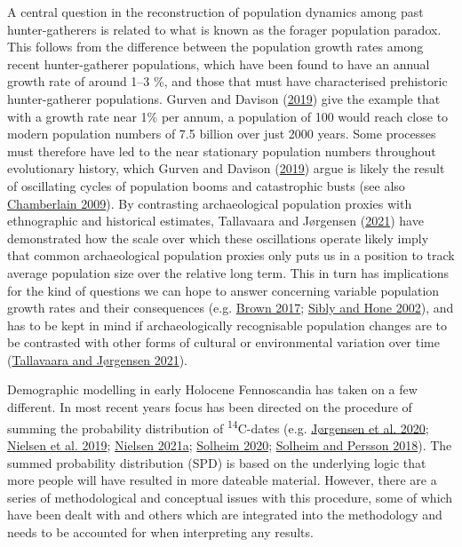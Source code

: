 \documentclass[
  12pt,
  a4paper,
  oneside]{book}
\begin{document}
A central question in the reconstruction of population dynamics among past hunter-gatherers is related to what is known as the forager population paradox. This follows from the difference between the population growth rates among recent hunter-gatherer populations, which have been found to have an annual growth rate of around 1--3 \%, and those that must have characterised prehistoric hunter-gatherer populations. Gurven and Davison (\protect\hyperlink{ref-gurven2019}{2019}) give the example that with a growth rate near 1\% per annum, a population of 100 would reach close to modern population numbers of 7.5 billion over just 2000 years. Some processes must therefore have led to the near stationary population numbers throughout evolutionary history, which Gurven and Davison (\protect\hyperlink{ref-gurven2019}{2019}) argue is likely the result of oscillating cycles of population booms and catastrophic busts (see also \protect\hyperlink{ref-chamberlain2009}{Chamberlain 2009}). By contrasting archaeological population proxies with ethnographic and historical estimates, Tallavaara and Jørgensen (\protect\hyperlink{ref-tallavaara2021}{2021}) have demonstrated how the scale over which these oscillations operate likely imply that common archaeological population proxies only puts us in a position to track average population size over the relative long term. This in turn has implications for the kind of questions we can hope to answer concerning variable population growth rates and their consequences (e.g. \protect\hyperlink{ref-brown2017}{Brown 2017}; \protect\hyperlink{ref-sibly2002}{Sibly and Hone 2002}), and has to be kept in mind if archaeologically recognisable population changes are to be contrasted with other forms of cultural or environmental variation over time (\protect\hyperlink{ref-tallavaara2021}{Tallavaara and Jørgensen 2021}).

Demographic modelling in early Holocene Fennoscandia has taken on a few different. In most recent years focus has been directed on the procedure of summing the probability distribution of \textsuperscript{14}C-dates (e.g. \protect\hyperlink{ref-jorgensen2020}{Jørgensen et al. 2020}; \protect\hyperlink{ref-nielsen2019}{Nielsen et al. 2019}; \protect\hyperlink{ref-nielsen2021}{Nielsen 2021a}; \protect\hyperlink{ref-solheim2020}{Solheim 2020}; \protect\hyperlink{ref-solheim2018}{Solheim and Persson 2018}). The summed probability distribution (SPD) is based on the underlying logic that more people will have resulted in more dateable material. However, there are a series of methodological and conceptual issues with this procedure, some of which have been dealt with and others which are integrated into the methodology and needs to be accounted for when interpreting any results.
\end{document}
